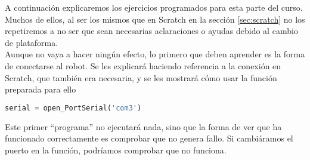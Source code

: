 A continuación explicaremos los ejercicios programados para esta parte del curso. Muchos de ellos, al ser los mismos que en Scratch en la sección \ref{sec:scratch} no los repetiremos a no ser que sean necesarias aclaraciones o ayudas debido al cambio de plataforma.\\

Aunque no vaya a hacer ningún efecto, lo primero que deben aprender es la forma de conectarse al robot. Se les explicará haciendo referencia a la conexión en Scratch, que también era necesaria, y se les mostrará cómo usar la función preparada para ello 
\begin{lstlisting}[language=Python]
	serial = open_PortSerial('com3')
\end{lstlisting}
Este primer ``programa'' no ejecutará nada, sino que la forma de ver que ha funcionado correctamente es comprobar que no genera fallo. Si cambiáramos el puerto en la función, podríamos comprobar que no funciona.
